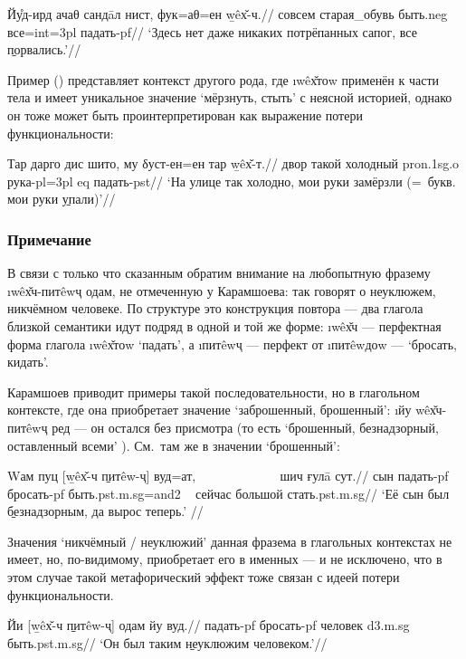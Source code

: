 \begingl
\gla Йу̊д-ирд ачаθ сандāл нист, фук=аθ=ен \b{wêх̌-ч}.//
 совсем старая\_обувь быть.{\sc neg} все={\sc int=3pl} падать-{\sc pf}//
\glft ‘Здесь нет даже никаких потрёпанных сапог, все \b{порвались}.’//
\endgl \xe

Пример () представляет контекст другого рода, где \i{wêх̌тоw} применён к части тела и имеет уникальное значение ‘мёрзнуть, стыть’ с неясной историей, однако он тоже может быть проинтерпретирован как выражение потери функциональности:

\begingl
\gla Тар дарго дис шито, му δуст-ен=ен тар \b{wêх̌-т}.//
 двор такой холодный {\sc pron.1sg.o} рука-{\sc pl=3pl} {\sc eq} падать-{\sc pst}//
\glft ‘На улице так холодно, мои руки замёрзли (=~букв. мои руки \b{упали})’//
\endgl \xe

\subsubsection*{Примечание}

В связи с только что сказанным обратим внимание на любопытную фразему \i{wêх̌ч-питêwҷ одам}, не отмеченную у Карамшоева: так говорят о неуклюжем, никчёмном человеке. По структуре это конструкция повтора — два глагола близкой семантики идут подряд в одной и той же форме: \i{wêх̌ч} — перфектная форма глагола \i{wêх̌тоw} ‘падать’, а \i{питêwҷ} — перфект от \i{питêwдоw} — ‘бросать, кидать’.

Карамшоев приводит примеры такой последовательности, но в глагольном контексте, где она приобретает значение ‘заброшенный, брошенный’: \i{йу wêх̌ч-питêwҷ ред} — он остался без присмотра (то есть ‘брошенный, безнадзорный, оставленный всеми’ \parencite[335]{karamshoev1988}). См.~там же в значении ‘брошенный’:

\begingl
\gla Wам пуц [\b{wêх̌-ч} \b{питêw-ҷ}] вуд=ат, ~~~~~~~~~~~~ шич ғулā сут.//
 сын падать-{\sc pf} бросать-{\sc pf} быть.{\sc pst.m.sg=and2} ~ сейчас большой стать.{\sc pst.m.sg}//
\glft ‘Её сын был \b{безнадзорным}, да вырос теперь.’ //
\endgl \xe

Значения ‘никчёмный / неуклюжий’ данная фразема в глагольных контекстах не имеет, но, по-видимому, приобретает его в именных — и не исключено, что в этом случае такой метафорический эффект тоже связан с идеей потери функциональности.

\begingl
\gla Йи [\b{wêх̌-ч} \b{питêw-ҷ}] одам йу вуд.//
 падать-{\sc pf} бросать-{\sc pf} человек {\sc d3.m.sg} быть.{\sc pst.m.sg}//
\glft ‘Он был таким \b{неуклюжим} человеком.’//
\endgl \xe

